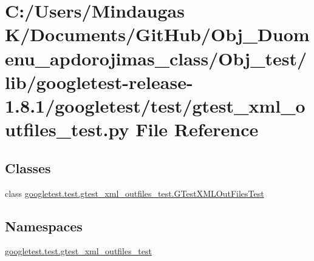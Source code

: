 \hypertarget{_obj__test_2lib_2googletest-release-1_88_81_2googletest_2test_2gtest__xml__outfiles__test_8py}{}\section{C\+:/\+Users/\+Mindaugas K/\+Documents/\+Git\+Hub/\+Obj\+\_\+\+Duomenu\+\_\+apdorojimas\+\_\+class/\+Obj\+\_\+test/lib/googletest-\/release-\/1.8.1/googletest/test/gtest\+\_\+xml\+\_\+outfiles\+\_\+test.py File Reference}
\label{_obj__test_2lib_2googletest-release-1_88_81_2googletest_2test_2gtest__xml__outfiles__test_8py}
\subsection*{Classes}
\begin{DoxyCompactItemize}
\item 
class \mbox{\hyperlink{classgoogletest_1_1test_1_1gtest__xml__outfiles__test_1_1_g_test_x_m_l_out_files_test}{googletest.\+test.\+gtest\+\_\+xml\+\_\+outfiles\+\_\+test.\+G\+Test\+X\+M\+L\+Out\+Files\+Test}}
\end{DoxyCompactItemize}
\subsection*{Namespaces}
\begin{DoxyCompactItemize}
\item 
 \mbox{\hyperlink{namespacegoogletest_1_1test_1_1gtest__xml__outfiles__test}{googletest.\+test.\+gtest\+\_\+xml\+\_\+outfiles\+\_\+test}}
\end{DoxyCompactItemize}

